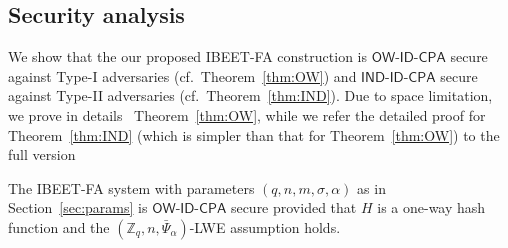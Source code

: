 \documentclass[runningheads,10pt]{llncs}
\def\ZZ{\mathbb{Z}}
\def\cal{\mathcal}
\def\OW{\textsf{OW-ID-CPA}}
\def\IND{\textsf{IND-ID-CPA}}
\def\a{\alpha}
\begin{document}
\subsection{Security analysis}
We show that the our proposed IBEET-FA construction is $\OW$ secure against Type-I adversaries (cf.~Theorem~\ref{thm:OW}) and $\IND$ secure against Type-II adversaries (cf.~Theorem~\ref{thm:IND}).  Due to space limitation, we prove in details ~Theorem~\ref{thm:OW}, while we refer the detailed proof for  Theorem~\ref{thm:IND} (which is simpler than that for  Theorem~\ref{thm:OW}) to the full version \cite{GWD+20-full}




\begin{theorem}\label{thm:OW}
	The IBEET-FA system with parameters $(q,n,m,\sigma,\alpha)$ as in Section~\eqref{sec:params} is  $\OW$ secure provided that $H$ is a one-way hash function and the $(\ZZ_q,n,\bar\Psi_\a)$-LWE assumption holds.
\end{theorem}
\end{document}
